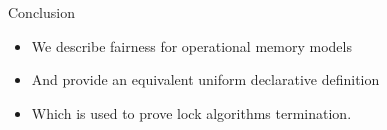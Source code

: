 \begin{frame}{Conclusion}
  \begin{itemize}
  \item We describe fairness for operational memory models
  \item And provide an equivalent uniform declarative definition
  \item Which is used to prove lock algorithms termination.
  \end{itemize}
\end{frame}
